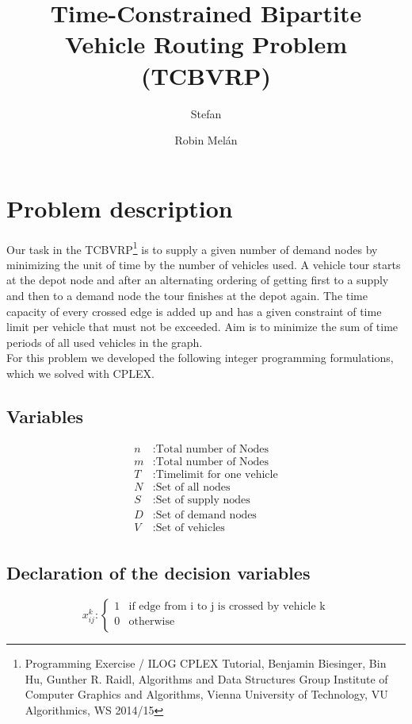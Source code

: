 \documentclass[a4paper]{article}
\begin{document}
\pagestyle{scrheadings}
\ihead{\pagemark} 

\author{Stefan  \and Robin Melán}
\title{Time-Constrained Bipartite Vehicle Routing Problem (TCBVRP)}
\maketitle
\vspace{0.5cm}

\section*{Problem description}
Our task in the TCBVRP\footnote{Programming Exercise / ILOG CPLEX Tutorial, Benjamin Biesinger, Bin Hu, Gunther R. Raidl, Algorithms and Data Structures Group Institute of Computer Graphics and Algorithms, Vienna University of Technology, VU Algorithmics, WS 2014/15} is to supply a given number of demand nodes by minimizing the unit of time by the number of vehicles used. A vehicle tour starts at the depot node and after an alternating ordering of getting first to a supply and then to a demand node the tour finishes at the depot again. The time capacity of every crossed edge is added up and has a given constraint of time limit per vehicle that must not be exceeded. Aim is to minimize the sum of time periods of all used vehicles in the graph.\\
For this problem we developed the following integer programming formulations, which we solved with CPLEX. 

\subsection*{Variables}
\begin{align*}
n &: \text{Total number of Nodes} \\
m &: \text{Total number of Nodes} \\
T &: \text{Timelimit for one vehicle} \\
N &: \text{Set of all nodes} \\
S &: \text{Set of supply nodes} \\
D &: \text{Set of demand nodes} \\
V &: \text{Set of vehicles} \\
\end{align*}

\subsection*{Declaration of the decision variables}
\begin{equation*}
x_{ij}^k : 
	\begin{cases}
	1 & \text{if edge from i to j is crossed by vehicle k} \\
	0 & \text{otherwise} \\
	\end{cases}
\end{equation*}
\end{document}

